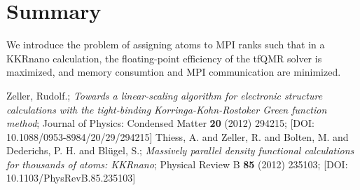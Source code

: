 \documentclass[a4paper]{article}
\newcommand{\MPIrank}{MPI rank} %
\begin{document}
\section{Summary} \label{sec:summary}

We introduce the problem of assigning atoms to \MPIrank{}s
such that in a KKRnano calculation, 
the floating-point efficiency of the tfQMR solver is maximized, and
memory consumtion and MPI communication are minimized.



\begin{thebibliography}{10}
 Zeller, Rudolf.;
   \textit{Towards a linear-scaling algorithm for electronic structure calculations with the tight-binding Korringa-Kohn-Rostoker {Green} function method};
    Journal of Physics: Condensed Matter \textbf{20} (2012) 294215;
    [DOI: 10.1088/0953-8984/20/29/294215]
 Thiess, A. and Zeller, R. and Bolten, M. and Dederichs, P. H. and Bl{\"u}gel, S.;
   \textit{Massively parallel density functional calculations for thousands of atoms: {KKRnano}};
    Physical Review B \textbf{85} (2012) 235103;
    [DOI: 10.1103/PhysRevB.85.235103]
\end{thebibliography}
\end{document}
